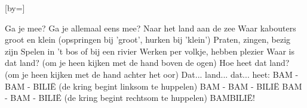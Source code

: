  

[by=]




\beginverse
    Ga je mee?
    Ga je allemaal eens mee?
    Naar het land aan de zee
    Waar kabouters groot en klein (opspringen bij 'groot', hurken bij 'klein')
    Praten, zingen, bezig zijn
    Spelen in 't bos of bij een rivier
    Werken per volkje, hebben plezier
    Waar is dat land? (om je heen kijken met de hand boven de ogen)
    Hoe heet dat land? (om je heen kijken met de hand achter het oor)
    Dat... land... dat... heet:
    BAM - BAM - BILI\"E (de kring begint linksom te huppelen)
    BAM - BAM - BILI\"E
    BAM - BAM - BILI\"E (de kring begint rechtsom te huppelen)
    BAMBILI\"E!
\endverse




\endsong
